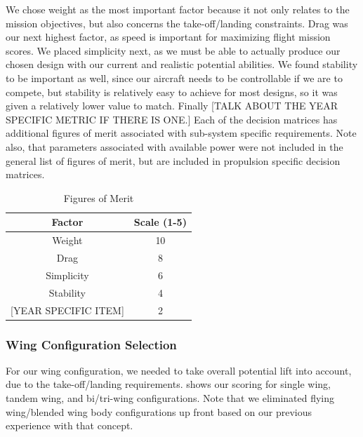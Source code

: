 \documentclass[report]{byu-aero}
\begin{document}
We chose weight as the most important factor because it not only relates to the mission objectives, but also concerns the take-off/landing constraints.  Drag was our next highest factor, as speed is important for maximizing flight mission scores.  We placed simplicity next, as we must be able to actually produce our chosen design with our current and realistic potential abilities.  We found stability to be important as well, since our aircraft needs to be controllable if we are to compete, but stability is relatively easy to achieve for most designs, so it was given a relatively lower value to match.  Finally {\color{\BYUred}[TALK ABOUT THE YEAR SPECIFIC METRIC IF THERE IS ONE.]} Each of the decision matrices has additional figures of merit associated with sub-system specific requirements. Note also, that parameters associated with available power were not included in the general list of figures of merit, but are included in propulsion specific decision matrices.

\begin{table}[h!]
	\centering
	\caption{Figures of Merit}
	\label{tab:fom}
	\begin{tabular}{ |c|c| } 
		\hline
		\rowcolor{BYUbluemid}
		Factor & Scale (1-5) \\
		\hline
		Weight & 10 \\
		\hline
		Drag & 8 \\
		\hline
		Simplicity & 6 \\
		\hline
		Stability & 4 \\
		\hline
		{\color{\BYUred} {\color{BYUred} [YEAR SPECIFIC ITEM]}} & 2 \\
		\hline
	\end{tabular}
\end{table}


\subsubsection{Wing Configuration Selection}

For our wing configuration, we needed to take overall potential lift into account, due to the take-off/landing requirements.   shows our scoring for single wing, tandem wing, and bi/tri-wing configurations.  Note that we eliminated flying wing/blended wing body configurations up front based on our previous experience with that concept.
\end{document}
